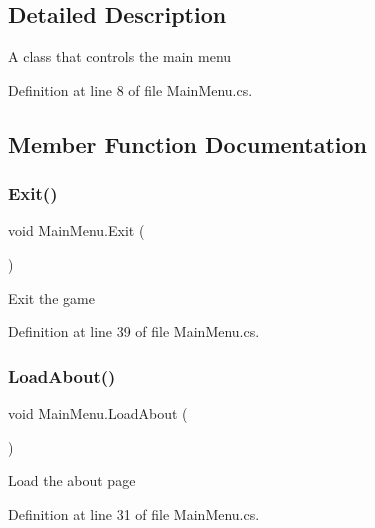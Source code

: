 \subsection{Detailed Description}
A class that controls the main menu 



Definition at line 8 of file Main\+Menu.\+cs.



\subsection{Member Function Documentation}
\mbox{\label{class_main_menu_a2a6f329d1d69aa2ccd1703b061c4d51e}} 
\subsubsection{\texorpdfstring{Exit()}{Exit()}}
{\footnotesize\ttfamily void Main\+Menu.\+Exit (\begin{DoxyParamCaption}{ }\end{DoxyParamCaption})}



Exit the game 



Definition at line 39 of file Main\+Menu.\+cs.

\mbox{\label{class_main_menu_aeeb49c53aadae1b1608c7d24ea60fca3}} 
\subsubsection{\texorpdfstring{Load\+About()}{LoadAbout()}}
{\footnotesize\ttfamily void Main\+Menu.\+Load\+About (\begin{DoxyParamCaption}{ }\end{DoxyParamCaption})}



Load the about page 



Definition at line 31 of file Main\+Menu.\+cs.

\mbox{\label{class_main_menu_a5e5cf3c9a40d8c3af4a7afb06a4a3f89}} 
